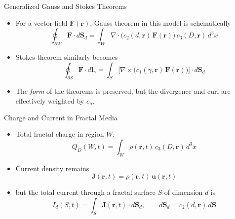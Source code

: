 \documentclass[11pt]{beamer}
\begin{document}
\begin{frame}{Generalized Gauss and Stokes Theorems}
\begin{itemize}
  \item For a vector field $\bm F(\bm r)$, Gauss theorem in this model is schematically
    \begin{equation*}
      \oint_{\partial W} \bm F \cdot d\bm S_d
      = \int_W \nabla \cdot \bigl( c_2(d,\bm r)\, \bm F(\bm r) \bigr)\, c_3(D,\bm r)\, d^3x
    \end{equation*}
  \item Stokes theorem similarly becomes
    \begin{equation*}
      \oint_{\partial S} \bm F \cdot d\bm l_\gamma
      = \int_S \bigl[ \nabla \times \bigl( c_1(\gamma,\bm r)\, \bm F(\bm r) \bigr) \bigr] \cdot d\bm S_d
    \end{equation*}
  \item The \emph{form} of the theorems is preserved, but the divergence and curl are effectively weighted by $c_n$.
\end{itemize}
\end{frame}

\begin{frame}{Charge and Current in Fractal Media}
\begin{itemize}
  \item Total fractal charge in region $W$:
    \begin{equation*}
      Q_D(W,t) = \int_W \rho(\bm r,t)\, c_3(D,\bm r)\, d^3x
    \end{equation*}
  \item Current density remains
    \begin{equation*}
      \bm J(\bm r,t) = \rho(\bm r,t)\, \bm u(\bm r,t)
    \end{equation*}
  \item but the total current through a fractal surface $S$ of dimension $d$ is
    \begin{equation*}
      I_d(S,t) = \int_S \bm J(\bm r,t) \cdot d\bm S_d, \qquad
      d\bm S_d = c_2(d,\bm r)\, d\bm S
    \end{equation*}
\end{itemize}
\end{frame}
\end{document}
